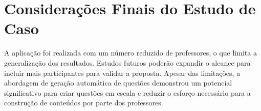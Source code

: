 \section{Considerações Finais do Estudo de Caso}
A aplicação foi realizada com um número reduzido de professores, o que limita a generalização dos resultados. Estudos futuros poderão expandir o alcance para incluir mais participantes para validar a proposta. Apesar das limitações, a abordagem de geração automática de questões demonstrou um potencial significativo para criar questões em escala e reduzir o esforço necessário para a construção de conteúdos por parte dos professores.
